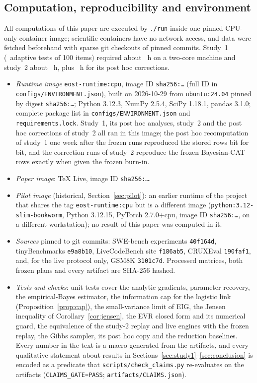 \subsection{Computation, reproducibility and environment}\label{sec:repro}
All computations of this paper are executed by \texttt{./run} inside one pinned CPU-only
container image; scientific containers have no network access, and data were fetched
beforehand with sparse git checkouts of pinned commits. Study~1 (\ConfirmRuns\ adaptive
tests of 100 items) required about \ConfirmHours~h on a two-core machine and study~2 about
\StudyTwoHours~h, plus \StudyTwoFixHours~h for its post hoc corrections.
\begin{itemize}\itemsep1pt\sloppy
\item \emph{Runtime image} \texttt{eost-runtime:cpu}, image ID \texttt{sha256:\ImageIdShort\dots}
(full ID in \texttt{configs/ENVIRONMENT.json}), built on 2026-10-29 from \texttt{ubuntu:24.04}
pinned by digest \texttt{sha256:\BaseDigestShort\dots}; Python 3.12.3, NumPy 2.5.4, SciPy
1.18.1, pandas 3.1.0; complete package list in \texttt{configs/ENVIRONMENT.json} and
\texttt{requirements.lock}. Study~1, its post hoc analyses, study~2 and the post hoc
corrections of study~2 all ran in this image; the post hoc recomputation of study~1 one week
after the frozen runs reproduced the stored rows bit for bit, and the correction runs of
study~2 reproduce the frozen Bayesian-CAT rows exactly when given the frozen burn-in.
\item \emph{Paper image}: TeX Live, image ID \texttt{sha256:\PaperImageIdShort\dots}.
\item \emph{Pilot image} (historical, Section~\ref{sec:pilot}): an earlier runtime of the
project that shares the tag \texttt{eost-runtime:cpu} but is a different image
(\texttt{python:3.12-slim-bookworm}, Python 3.12.15, PyTorch 2.7.0+cpu, image ID
\texttt{sha256:\PilotImageIdShort\dots}, on a different workstation); no result of this paper
was computed in it.
\item \emph{Sources} pinned to git commits: SWE-bench experiments \texttt{40f164d},
tinyBenchmarks \texttt{e9a8b10}, LiveCodeBench site \texttt{f186ab5}, CRUXEval
\texttt{190faf1}, and, for the live protocol only, GSM8K \texttt{3101c7d}. Processed
matrices, both frozen plans and every artifact are SHA-256 hashed.
\item \emph{Tests and checks}: unit tests cover the analytic gradients, parameter recovery,
the empirical-Bayes estimator, the information cap for the logistic link
(Proposition~\ref{prop:cap}), the small-variance limit of EIG, the Jensen inequality of
Corollary~\ref{cor:jensen}, the EVR closed form and its numerical guard, the equivalence of
the study-2 replay and live engines with the frozen replay, the Gibbs sampler, its post hoc
copy and the reduction baselines. Every number in the text is a macro generated from the
artifacts, and every qualitative statement about results in
Sections~\ref{sec:study1}--\ref{sec:conclusion} is encoded as a predicate that
\texttt{scripts/check\_claims.py} re-evaluates on the artifacts
(\texttt{CLAIMS\_GATE=PASS}; \texttt{artifacts/CLAIMS.json}).
\end{itemize}
